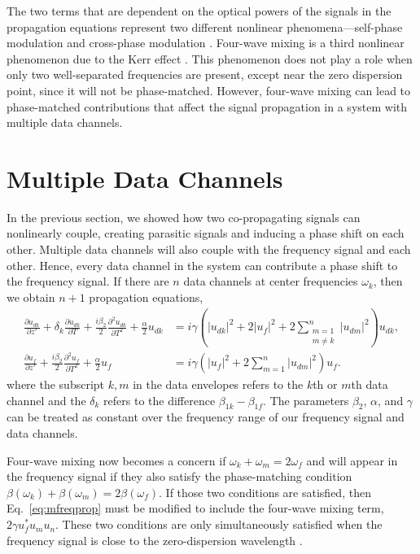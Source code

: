 The two terms that are dependent on the optical powers of the signals in the propagation equations represent two different nonlinear phenomena---self-phase modulation and cross-phase modulation \cite{Agrawal2013}. Four-wave mixing is a third nonlinear phenomenon due to the Kerr effect \cite{Agrawal2013,Boyd2003}. This phenomenon does not play a role when only two well-separated frequencies are present, except near the zero dispersion point, since it will not be phase-matched. However, four-wave mixing can lead to phase-matched contributions that affect the signal propagation in a system with multiple data channels.

\section{Multiple Data Channels} \label{sec:multiple}

In the previous section, we showed how two co-propagating signals can nonlinearly couple, creating parasitic signals and inducing a phase shift on each other. Multiple data channels will also couple with the frequency signal and each other. Hence, every data channel in the system can contribute a phase shift to the frequency signal. If there are $n$ data channels at center frequencies $\omega_k$, then we obtain $n+1$ propagation equations,
%
\begin{subequations}
\begin{align}
\frac{\partial u_{dk}}{\partial z'} + \delta_k\frac{\partial u_{dk}}{\partial T} + \frac{i\beta_{2}}{2}\frac{\partial^2 u_{dk}}{\partial T^2} + \frac{\alpha}{2}u_{dk} &= i\gamma\left(|u_{dk}|^2 + 2|u_f|^2 + 2\sum_{\substack{m=1\\ m\neq k}}^n|u_{dm}|^2\right)u_{dk}, \label{eq:mdataprop} \\
\frac{\partial u_f}{\partial z'} + \frac{i\beta_{2}}{2}\frac{\partial^2 u_f}{\partial T^2} + \frac{\alpha}{2}u_f &= i\gamma\left(|u_f|^2 + 2\sum_{m=1}^n|u_{dm}|^2\right)u_f. \label{eq:mfreqprop}
\end{align}
\end{subequations}
%
where the subscript $k,m$ in the data envelopes refers to the $k$th or $m$th data channel and the $\delta_k$ refers to the difference $\beta_{1k} - \beta_{1f}$. The parameters $\beta_2$, $\alpha$, and $\gamma$ can be treated as constant over the frequency range of our frequency signal and data channels.

Four-wave mixing now becomes a concern if $\omega_k + \omega_m = 2\omega_f$ and will appear in the frequency signal if they also satisfy the phase-matching condition $\beta(\omega_k) + \beta(\omega_m) = 2\beta(\omega_f)$. If those two conditions are satisfied, then Eq.~\ref{eq:mfreqprop} must be modified to include the four-wave mixing term, $2\gamma u_f^*u_mu_n$. These two conditions are only simultaneously satisfied when the frequency signal is close to the zero-dispersion wavelength \cite{Agrawal2013}.

